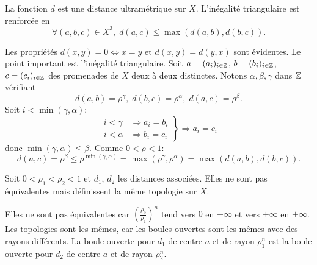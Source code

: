 \begin{prop}
 La fonction $d$ est une distance ultramétrique sur $X$. L'inégalité triangulaire est renforcée en
 \begin{displaymath}
  \forall (a,b,c)\in X^3, \; d(a,c) \leq \max(d(a,b),d(b,c)).
 \end{displaymath}
\end{prop}
\begin{demo}
Les propriétés $d(x,y)=0 \Leftrightarrow x=y$ et $d(x,y)=d(y,x)$ sont évidentes. Le point important est l'inégalité triangulaire.\newline
Soit $a = (a_i)_{i \in \mathbb{Z}}$, $b = (b_i)_{i\in \mathbb{Z}}$, $c = (c_i)_{i \in \mathbb{Z}}$ des promenades de $X$ deux à deux distinctes. Notons $\alpha, \beta, \gamma$ dans $\mathbb{Z}$ vérifiant
\begin{displaymath}
 d(a,b) = \rho^\gamma, \; d(b,c) = \rho^\alpha, \; d(a,c) = \rho^\beta.
\end{displaymath}
Soit $i < \min(\gamma, \alpha)$:
\begin{displaymath}
 \left.
 \begin{aligned}
  i < \gamma &\Rightarrow a_i = b_i \\
  i < \alpha &\Rightarrow b_i = c_i
 \end{aligned}
 \right\rbrace
 \Rightarrow a_i = c_i
\end{displaymath}
donc $\min(\gamma,\alpha)\leq \beta$. Comme $0 <  \rho < 1$:
\begin{displaymath}
 d(a,c) = \rho^\beta \leq \rho^{\min(\gamma,\alpha)}= \max(\rho^\gamma, \rho^\alpha) = \max(d(a,b),d(b,c)).
\end{displaymath}
\end{demo}

\begin{propn}\label{Prop:PromIdemTopo}
  Soit $0 < \rho_1 < \rho_2 <1$ et $d_1$, $d_2$ les distances associées. Elles ne sont pas équivalentes mais définissent la même topologie sur $X$.
\end{propn}
\begin{demo}
Elles ne sont pas équivalentes car $(\frac{\rho_2}{\rho_1})^n$ tend vers $0$ en $-\infty$ et vers $+\infty$ en $+\infty$.\newline
Les topologies sont les mêmes, car les boules ouvertes sont les mêmes avec des rayons différents. La boule ouverte pour $d_1$ de centre $a$ et de rayon $\rho_1^n$ est la boule ouverte pour $d_2$ de centre $a$ et de rayon $\rho_2^n$.
\end{demo}


